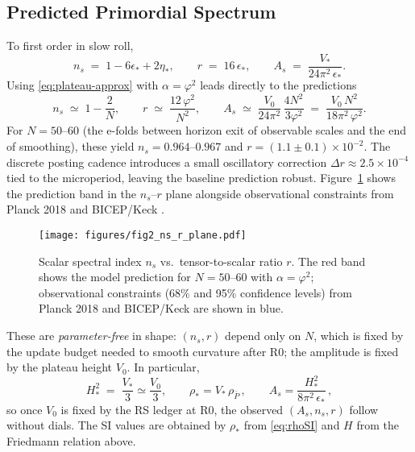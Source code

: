 \documentclass[11pt]{article}
\theoremstyle{definition}
\theoremstyle{remark}
\begin{document}
\subsection{Predicted Primordial Spectrum}
To first order in slow roll,
\begin{equation}
  n_s \;=\; 1-6\epsilon_*+2\eta_*,
  \qquad
  r \;=\; 16\,\epsilon_*,
  \qquad
  A_s \;=\; \frac{V_*}{24\pi^2\,\epsilon_*}.
  \label{eq:sr-obs}
\end{equation}
Using \eqref{eq:plateau-approx} with \(\alpha=\varphi^2\) leads directly to the predictions
\begin{equation}
  n_s \;\simeq\; 1-\frac{2}{N},
  \qquad
  r \;\simeq\; \frac{12\,\varphi^2}{N^2},
  \qquad
  A_s \;\simeq\; \frac{V_0}{24\pi^2}\,\frac{4N^2}{3\varphi^2}
                \;=\; \frac{V_0\,N^2}{18\pi^2\,\varphi^2}.
  \label{eq:ns-r-As}
\end{equation}
For \(N=50\)--\(60\) (the e-folds between horizon exit of observable scales and the end of smoothing), these yield \(n_s = 0.964\)--\(0.967\) and \(r = (1.1 \pm 0.1)\times10^{-2}\). The discrete posting cadence introduces a small oscillatory correction \(\Delta r \approx 2.5\times10^{-4}\) tied to the microperiod, leaving the baseline prediction robust. Figure~\ref{fig:nsr} shows the prediction band in the \(n_s\)--\(r\) plane alongside observational constraints from Planck 2018 \citep{Planck2018} and BICEP/Keck \citep{BICEPKeck2021}.

\begin{figure}[htbp]
\centering
\texttt{[image: figures/fig2\_ns\_r\_plane.pdf]}
\caption{Scalar spectral index \(n_s\) vs.\ tensor-to-scalar ratio \(r\). The red band shows the model prediction for \(N=50\)--\(60\) with \(\alpha=\varphi^2\); observational constraints (68\% and 95\% confidence levels) from Planck 2018 and BICEP/Keck are shown in blue.}
\label{fig:nsr}
\end{figure}

These are \emph{parameter-free} in shape: \((n_s,r)\) depend only on \(N\), which is fixed by the update budget needed to smooth curvature after R0; the amplitude is fixed by the plateau height \(V_0\). In particular,
\begin{equation}
  H_*^2 \;=\; \frac{V_*}{3} \simeq \frac{V_0}{3}, 
  \qquad
  \rho_* = V_*\,\rho_{\bar P} \,,
  \qquad
  A_s = \frac{H_*^2}{8\pi^2\,\epsilon_*} \,,
  \label{eq:As-H}
\end{equation}
so once \(V_0\) is fixed by the RS ledger at R0, the observed \((A_s,n_s,r)\) follow without dials. The SI values are obtained by \(\rho_*\) from \eqref{eq:rhoSI} and \(H\) from the Friedmann relation above.
\end{document}
